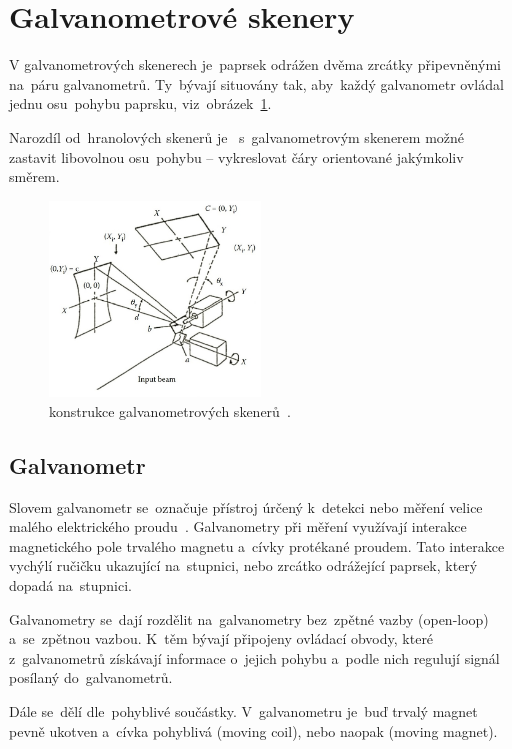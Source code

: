 \section{Galvanometrové skenery}
V galvanometrových skenerech je~paprsek odrážen dvěma zrcátky připevněnými na~páru galvanometrů. Ty~bývají situovány tak,  aby~každý galvanometr ovládal jednu  osu~pohybu paprsku,  viz~obrázek~\ref{fig:scanner-constructions}.

Narozdíl od~hranolových skenerů je ~s~galvanometrovým skenerem možné zastavit libovolnou  osu~pohybu -- vykreslovat čáry orientované jakýmkoliv směrem.

\begin{figure}[htb]
  \centering
  \includegraphics[width=0.5\textwidth]{img/scanner-constructions.jpg}
  \caption{\label{fig:scanner-constructions} konstrukce galvanometrových skenerů~\cite{scanning-handbook}.}
\end{figure}

\subsection{Galvanometr}
Slovem galvanometr se~označuje přístroj úrčený k~detekci nebo měření velice malého elektrického proudu~\cite{galvo-definition}. Galvanometry při měření využívají interakce magnetického pole trvalého magnetu a~cívky protékané proudem. Tato interakce vychýlí ručičku ukazující na~stupnici, nebo zrcátko odrážející paprsek, který dopadá na~stupnici.~\cite{wiki-galvo}

Galvanometry se~dají rozdělit na~galvanometry  bez~zpětné vazby (open-loop) a~se~zpětnou vazbou. K~těm bývají připojeny ovládací obvody, které z~galvanometrů získávají informace o~jejich pohybu a~podle nich regulují signál posílaný do~galvanometrů.~\cite{wiki-galvo}

Dále se~dělí  dle~pohyblivé součástky. V~galvanometru je~buď trvalý magnet pevně ukotven a~cívka pohyblivá (moving coil), nebo naopak (moving magnet). %

